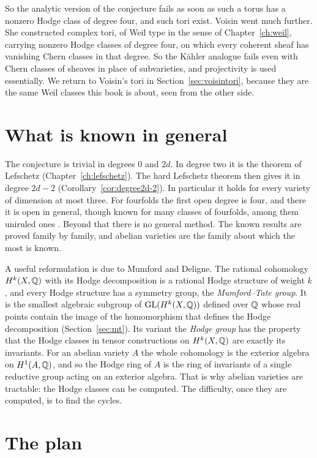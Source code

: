 So the analytic version of the conjecture fails as soon as such a torus has
a nonzero Hodge class of degree four, and such tori exist.
Voisin \cite{Voi02b} went much further. She constructed complex tori, of Weil
type in the sense of Chapter~\ref{ch:weil}, carrying nonzero Hodge classes
of degree four, on which every coherent sheaf has vanishing Chern classes
in that degree. So the K\"ahler analogue fails even with Chern classes of
sheaves in place of subvarieties, and projectivity is used essentially.
We return to Voisin's tori in Section~\ref{sec:voisintori}, because they
are the same Weil classes this book is about, seen from the other side.

\section{What is known in general}

The conjecture is trivial in degrees $0$ and $2d$. In degree two it is the
theorem of Lefschetz (Chapter~\ref{ch:lefschetz}). The hard Lefschetz
theorem then gives it in degree $2d-2$ (Corollary~\ref{cor:degree2d-2}).
In particular it holds for every variety of dimension at most three. For
fourfolds the first open degree is four, and there it is open in general,
though known for many classes of fourfolds, among them uniruled ones
\cite{CM78}. Beyond that there is no general method. The known results are
proved family by family, and abelian varieties are the family about which
the most is known.

A useful reformulation is due to Mumford and Deligne. The rational
cohomology $H^{k}(X,\mathbb{Q})$ with its Hodge decomposition is a rational Hodge
structure of weight $k$, and every Hodge structure has a symmetry group,
the \emph{Mumford--Tate group}. It is the smallest algebraic subgroup of
$\operatorname{GL}(H^{k}(X,\mathbb{Q}))$ defined over $\mathbb{Q}$ whose real points contain the image
of the homomorphism that defines the Hodge decomposition
(Section~\ref{sec:mt}). Its variant the \emph{Hodge group} has the
property that the Hodge classes in tensor constructions on $H^{k}(X,\mathbb{Q})$
are exactly its invariants. For an abelian variety $A$ the whole
cohomology is the exterior algebra on $H^{1}(A,\mathbb{Q})$, and so the Hodge ring
of $A$ is the ring of invariants of a single reductive group acting on an
exterior algebra. That is why abelian varieties are tractable: the Hodge classes can
be computed. The difficulty, once they are computed, is to find the cycles.

\section{The plan}

